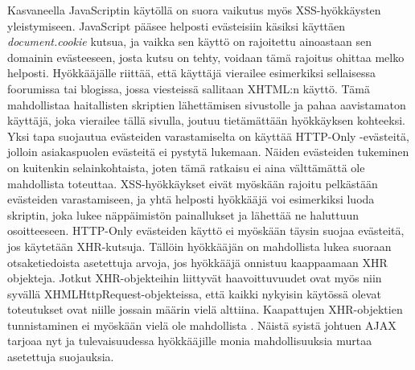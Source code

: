 Kasvaneella JavaScriptin käytöllä on suora vaikutus myös XSS-hyökkäysten yleistymiseen. JavaScript pääsee helposti evästeisiin käsiksi käyttäen \emph{document.cookie} kutsua, ja vaikka sen 
käyttö on rajoitettu ainoastaan sen domainin evästeeseen, josta kutsu on tehty, voidaan tämä rajoitus ohittaa melko helposti. Hyökkääjälle riittää, että käyttäjä vierailee esimerkiksi sellaisessa
foorumissa tai blogissa, jossa viesteissä sallitaan XHTML:n käyttö. Tämä mahdollistaa haitallisten skriptien lähettämisen sivustolle ja pahaa aavistamaton käyttäjä, joka vierailee tällä
sivulla, joutuu tietämättään hyökkäyksen kohteeksi. Yksi tapa suojautua evästeiden varastamiselta on käyttää HTTP-Only -evästeitä, jolloin asiakaspuolen evästeitä ei pystytä lukemaan. Näiden
evästeiden tukeminen on kuitenkin selainkohtaista, joten tämä ratkaisu ei aina välttämättä ole mahdollista toteuttaa. XSS-hyökkäykset eivät myöskään rajoitu pelkästään evästeiden varastamiseen,
ja yhtä helposti hyökkääjä voi esimerkiksi luoda skriptin, joka lukee näppäimistön painallukset ja lähettää ne haluttuun osoitteeseen. HTTP-Only evästeiden käyttö ei myöskään täysin suojaa 
evästeitä, jos käytetään XHR-kutsuja. Tällöin hyökkääjän on mahdollista lukea suoraan otsaketiedoista asetettuja arvoja, jos hyökkääjä onnistuu kaappaamaan XHR objekteja. Jotkut XHR-objekteihin
liittyvät haavoittuvuudet ovat myös niin syvällä XHMLHttpRequest-objekteissa, että kaikki nykyisin käytössä olevat toteutukset ovat niille jossain määrin vielä alttiina. Kaapattujen XHR-objektien 
tunnistaminen ei myöskään vielä ole mahdollista \cite{AJAX}. Näistä syistä johtuen AJAX tarjoaa nyt ja tulevaisuudessa hyökkääjille monia mahdollisuuksia murtaa asetettuja suojauksia.

